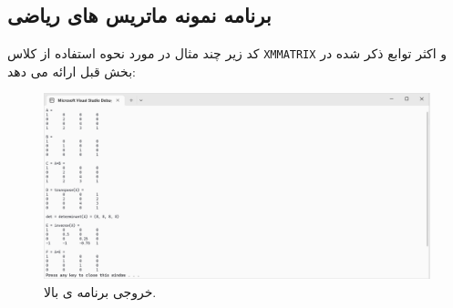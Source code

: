 \subsection{\textbf{برنامه نمونه ماتریس های ریاضی }}
\label{subsec:2.8.3}
{
    \Large
    \begin{spacing}{1.5}
        کد زیر چند مثال در مورد نحوه استفاده از کلاس \texttt{XMMATRIX} و اکثر توابع ذکر شده در بخش قبل ارائه می دهد:
        \textbf{\vspace{6pt}}
        \lr{}
        \textbf{\vspace{6pt}}

        \begin{figure}[H]
            \centering
            \setlength{\belowcaptionskip}{-10pt}
            \includegraphics[width=\textwidth]{Images/4/2/4.Session.1.2.1}
            \caption {خروجی برنامه ی بالا.}
            \label{fig:4.Session.1.2.1}
        \end{figure}
    \end{spacing}
}
\newpage


